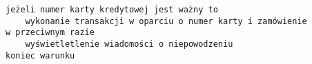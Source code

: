 \documentclass[a4paper,12pt]{book}
\begin{document}
\begin{lstlisting}
jeżeli numer karty kredytowej jest ważny to
	wykonanie transakcji w oparciu o numer karty i zamówienie
w przeciwnym razie
	wyświetletlenie wiadomości o niepowodzeniu
koniec warunku
\end{lstlisting}
\end{document}
